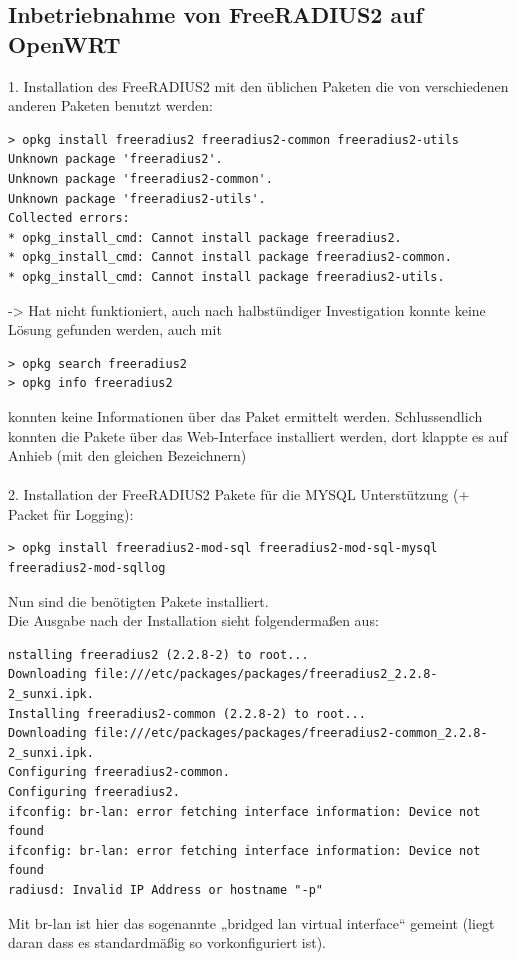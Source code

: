 {{\subsection{Inbetriebnahme von FreeRADIUS2 auf OpenWRT}
1. Installation des FreeRADIUS2 mit den üblichen Paketen die von verschiedenen anderen Paketen
benutzt werden:
\begin{lstlisting}
> opkg install freeradius2 freeradius2-common freeradius2-utils
Unknown package 'freeradius2'.
Unknown package 'freeradius2-common'.
Unknown package 'freeradius2-utils'.
Collected errors:
* opkg_install_cmd: Cannot install package freeradius2.
* opkg_install_cmd: Cannot install package freeradius2-common.
* opkg_install_cmd: Cannot install package freeradius2-utils.
\end{lstlisting}
-> Hat nicht funktioniert, auch nach halbstündiger Investigation konnte keine Lösung gefunden
werden, auch mit
\begin{lstlisting}
> opkg search freeradius2
> opkg info freeradius2
\end{lstlisting}
konnten keine Informationen über das Paket ermittelt werden. Schlussendlich konnten die Pakete
über das Web-Interface installiert werden, dort klappte es auf Anhieb (mit den gleichen
Bezeichnern)\\
~\\
2. Installation der FreeRADIUS2 Pakete für die MYSQL Unterstützung (+ Packet für Logging):
\begin{lstlisting}
> opkg install freeradius2-mod-sql freeradius2-mod-sql-mysql freeradius2-mod-sqllog
\end{lstlisting}
Nun sind die benötigten Pakete installiert.\\
\newpage
Die Ausgabe nach der Installation sieht folgendermaßen aus:
\begin{lstlisting}
nstalling freeradius2 (2.2.8-2) to root...
Downloading file:///etc/packages/packages/freeradius2_2.2.8-2_sunxi.ipk.
Installing freeradius2-common (2.2.8-2) to root...
Downloading file:///etc/packages/packages/freeradius2-common_2.2.8-2_sunxi.ipk.
Configuring freeradius2-common.
Configuring freeradius2.
ifconfig: br-lan: error fetching interface information: Device not found
ifconfig: br-lan: error fetching interface information: Device not found
radiusd: Invalid IP Address or hostname "-p"
\end{lstlisting}
Mit br-lan ist hier das sogenannte „bridged lan virtual interface“ gemeint (liegt daran dass es
standardmäßig so vorkonfiguriert ist).\\
}}
